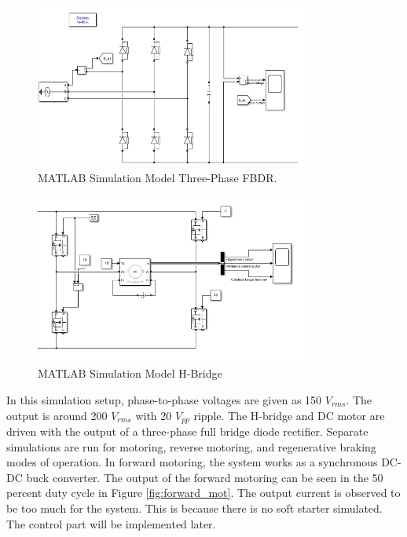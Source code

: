 \begin{figure}[ht]
    \centering
    \includegraphics[width=0.8\textwidth]{matlab/MATLAB_model_rect.png}
    \caption{MATLAB Simulation Model Three-Phase FBDR.}
    \label{fig:matlab_model1}
\end{figure}

\begin{figure}[ht]
    \centering
    \includegraphics[width=0.8\textwidth]{matlab/MATLAB_model_hbrid.png}
    \caption{MATLAB Simulation Model H-Bridge}
    \label{fig:matlab_model2}
\end{figure}

In this simulation setup, phase-to-phase voltages are given as 150 $V_{rms}$. The output is around 200 $V_{rms}$ with 20 $V_{pp}$ ripple. The H-bridge and DC motor are driven with the output of a three-phase full bridge diode rectifier. Separate simulations are run for motoring, reverse motoring, and regenerative braking modes of operation. In forward motoring, the system works as a synchronous DC-DC buck converter. The output of the forward motoring can be seen in the 50 percent duty cycle in Figure \ref{fig:forward_mot}. The output current is observed to be too much for the system. This is because there is no soft starter simulated. The control part will be implemented later.

